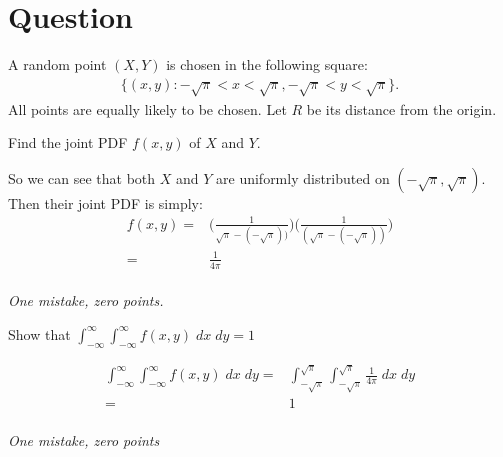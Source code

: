 \section{Question}

A random point $(X,Y)$ is chosen in the following square:
\begin{align*}
    \{(x, y) : -\sqrt{\pi} < x < \sqrt{\pi}, -\sqrt{\pi} < y < \sqrt{\pi} \}.
\end{align*}
All points are equally likely to be chosen. Let $R$ be its distance from the origin.
\begin{exercise}[0.5]
Find the joint PDF $f(x,y)$ of $X$ and $Y$.
\begin{solution}
So we can see that both $X$ and $Y$ are uniformly distributed on $(-\sqrt{\pi}, \sqrt{\pi})$. Then their joint PDF is simply:
\begin{align*}
    f(x,y) =& \Big(\frac{1}{\sqrt{\pi} - (-\sqrt{\pi}))} \Big) \Big(\frac{1}{(\sqrt{\pi} - (-\sqrt{\pi}))} \Big) \\
    =& \frac{1}{4 \pi}
\end{align*} \\
\textit{One mistake, zero points.}
\end{solution}
\end{exercise}

\begin{exercise}[0.5]
Show that $\int_{-\infty}^\infty \int_{-\infty}^\infty f(x,y) \; dx \; dy = 1$
\begin{solution}
 \begin{align*}
      \int_{-\infty}^\infty \int_{-\infty}^\infty f(x,y) \; dx \; dy =& \int_{-\sqrt{\pi}}^{\sqrt{\pi}} \int_{-\sqrt{\pi}}^{\sqrt{\pi}} \frac{1}{4\pi} \; dx \; dy \\
      =& 1
    \end{align*} \\
    \textit{One mistake, zero points}
\end{solution}

\end{exercise}

